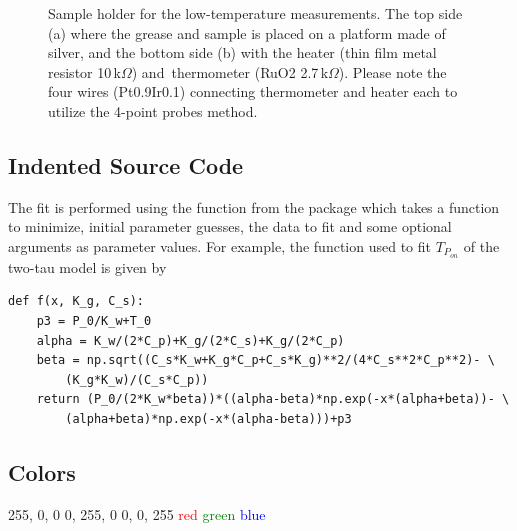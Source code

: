 		\begin{figure}[!h]
			\centering
			\hfill
			\caption[Sample holder for low-temperature measurements]{Sample holder for the low-temperature measurements. The top side (a) where the grease and sample is placed on a platform made of silver, and the bottom side (b) with the heater (thin film metal resistor 10\,k\(\Omega\)) \mbox{and  thermometer} (RuO2 2.7\,k\(\Omega\)). Please note the four wires (Pt0.9Ir0.1) connecting thermometer and heater each to utilize the 4-point probes method.}
			\label{fig:sec2.sample_holder_both}
		\end{figure}

	\subsection{Indented Source Code}
		\verbdef{}
		\verbdef{}

		The fit is performed using the function \leastsq\hspace{3px}from the package \optimize\hspace{3px} which takes a function to minimize, initial parameter guesses, the data to fit and some optional arguments as parameter values. For example, the function used to fit \( T_{P_{on}} \) of the two-tau model is given by
\begin{Verbatim}[tabsize=4]
def f(x, K_g, C_s):
	p3 = P_0/K_w+T_0
	alpha = K_w/(2*C_p)+K_g/(2*C_s)+K_g/(2*C_p)
	beta = np.sqrt((C_s*K_w+K_g*C_p+C_s*K_g)**2/(4*C_s**2*C_p**2)- \
		(K_g*K_w)/(C_s*C_p))
	return (P_0/(2*K_w*beta))*((alpha-beta)*np.exp(-x*(alpha+beta))- \
		(alpha+beta)*np.exp(-x*(alpha-beta)))+p3
\end{Verbatim}

	\subsection{Colors}
	\definecolor{red}{RGB}		{255,	0,		0}
	\definecolor{green}{RGB}	{0,		255,	0}
	\definecolor{blue}{RGB}		{0, 	0, 		255}
	\textcolor{red}{red} \textcolor{green}{green} \textcolor{blue}{blue}
